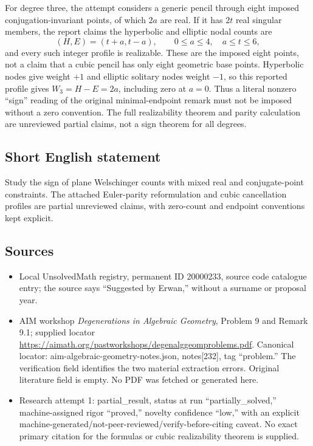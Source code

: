 \documentclass[11pt]{article}
\begin{document}
For degree three, the attempt considers a generic pencil through eight imposed conjugation-invariant points, of which $2a$ are real. If it has $2t$ real singular members, the report claims the hyperbolic and elliptic nodal counts are
\[
 (H,E)=(t+a,t-a),\qquad
 0\le a\le4,\quad a\le t\le6,
\]
and every such integer profile is realizable. These are the imposed eight points, not a claim that a cubic pencil has only eight geometric base points. Hyperbolic nodes give weight $+1$ and elliptic solitary nodes weight $-1$, so this reported profile gives $W_3=H-E=2a$, including zero at $a=0$. Thus a literal nonzero ``sign'' reading of the original minimal-endpoint remark must not be imposed without a zero convention. The full realizability theorem and parity calculation are unreviewed partial claims, not a sign theorem for all degrees.
\subsection{Short English statement}
Study the sign of plane Welschinger counts with mixed real and conjugate-point constraints. The attached Euler-parity reformulation and cubic cancellation profiles are partial unreviewed claims, with zero-count and endpoint conventions kept explicit.
\subsection{Sources}
\begin{itemize}
\item Local UnsolvedMath registry, permanent ID 20000233, source code catalogue entry; the source says ``Suggested by Erwan,'' without a surname or proposal year.
\item AIM workshop \emph{Degenerations in Algebraic Geometry}, Problem 9 and Remark 9.1; supplied locator \url{https://aimath.org/pastworkshops/degenalggeomproblems.pdf}. Canonical locator: aim-algebraic-geometry-notes.json, notes[232], tag ``problem.'' The verification field identifies the two material extraction errors. Original literature field is empty. No PDF was fetched or generated here.
\item Research attempt 1: partial\_result, status at run ``partially\_solved,'' machine-assigned rigor ``proved,'' novelty confidence ``low,'' with an explicit machine-generated/not-peer-reviewed/verify-before-citing caveat. No exact primary citation for the formulas or cubic realizability theorem is supplied.
\end{itemize}
\end{document}
